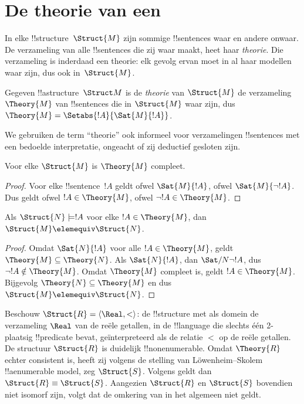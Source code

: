\documentclass[../../../include/open-logic-section]{subfiles}
\begin{document}

\section{De theorie van een }

In elke !!{structure}~$\Struct{M}$ zijn sommige !!{sentence}s waar en
andere onwaar. De verzameling van alle !!{sentence}s die zij waar maakt,
heet haar \emph{theorie}. Die verzameling is inderdaad een theorie: elk
gevolg ervan moet in al haar modellen waar zijn, dus ook in~$\Struct{M}$.

\begin{defn}
  Gegeven !!a{structure}~$\Struct M$ is de \emph{theorie} van
  $\Struct{M}$ de verzameling $\Theory{M}$ van !!{sentence}s
  die in $\Struct{M}$ waar zijn, dus $\Theory{M} =
  \Setabs{!A}{\Sat{M}{!A}}$.
\end{defn}

We gebruiken de term ``theorie'' ook informeel voor verzamelingen
!!{sentence}s met een bedoelde interpretatie, ongeacht of zij deductief
gesloten zijn.

\begin{prop}
Voor elke $\Struct{M}$ is $\Theory{M}$ compleet.
\end{prop}

\begin{proof}
Voor elke !!{sentence}~$!A$ geldt ofwel $\Sat{M}{!A}$, ofwel
$\Sat{M}{\lnot !A}$. Dus geldt ofwel $!A \in \Theory{M}$, ofwel
$\lnot !A \in \Theory{M}$.
\end{proof}

\begin{prop}
  Als $\Struct{N} \models !A$ voor elke $!A \in \Theory{M}$, dan
  $\Struct{M} \elemequiv \Struct{N}$.
\end{prop}

\begin{proof}
Omdat $\Sat{N}{!A}$ voor alle $!A \in \Theory{M}$, geldt
$\Theory{M} \subseteq \Theory{N}$. Als $\Sat{N}{!A}$, dan
$\Sat/{N}{\lnot !A}$, dus $\lnot !A \notin \Theory{M}$. Omdat
$\Theory{M}$ compleet is, geldt $!A \in \Theory{M}$. Bijgevolg
$\Theory{N} \subseteq \Theory{M}$ en dus
$\Struct{M} \elemequiv \Struct{N}$.
\end{proof}

\begin{rem}
  Beschouw $\Struct{R} = \langle\Real, <\rangle$: de !!{structure} met
  als domein de verzameling $\Real$ van de reële getallen, in de
  !!{language} die slechts één 2-plaatsig !!{predicate} bevat, geïnterpreteerd
  als de relatie $<$ op de reële getallen. De structuur $\Struct{R}$ is
  duidelijk !!{nonenumerable}. Omdat $\Theory{R}$ echter consistent is,
  heeft zij volgens de stelling van L\"owenheim--Skolem !!a{enumerable}
  model, zeg $\Struct{S}$. Volgens  geldt dan
  $\Struct{R} \equiv \Struct{S}$. Aangezien $\Struct{R}$ en $\Struct{S}$
  bovendien niet isomorf zijn, volgt dat de omkering van
   in het algemeen niet geldt.
\end{rem}
\end{document}

